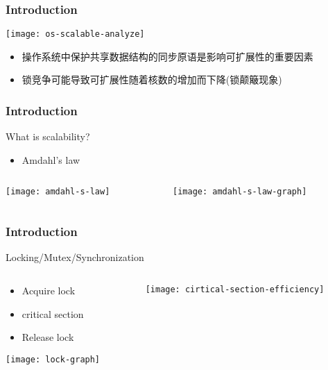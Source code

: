 \begin{frame}[plain]	
	\frametitle{Introduction}

	\texttt{[image: os-scalable-analyze]}
	\begin{itemize}
		\item 操作系统中保护共享数据结构的同步原语是影响可扩展性的重要因素 
		\item 锁竞争可能导致可扩展性随着核数的增加而下降(锁颠簸现象)
	\end{itemize}
\end{frame}

\begin{frame}[plain]	
	\frametitle{Introduction}
	\Large \centering
	What is scalability? 
	\begin{itemize}
		\item Amdahl's law
	\end{itemize}
	
	\begin{columns}
		
		\begin{column}{.5\textwidth}
			\texttt{[image: amdahl-s-law]}
		\end{column}
		\begin{column}{.5\textwidth}
			\texttt{[image: amdahl-s-law-graph]}
		\end{column}
	\end{columns}
\end{frame}



\begin{frame}[plain]	
	\frametitle{Introduction}
	\Large \centering
	Locking/Mutex/Synchronization 

	
	\begin{columns}
		
		\begin{column}{.5\textwidth}
				\begin{itemize}
				\item Acquire lock
				\item critical section
				\item Release lock
			\end{itemize}
			\texttt{[image: lock-graph]}
		\end{column}
		\begin{column}{.5\textwidth}
			\texttt{[image: cirtical-section-efficiency]}
		\end{column}
	\end{columns}
\end{frame}


